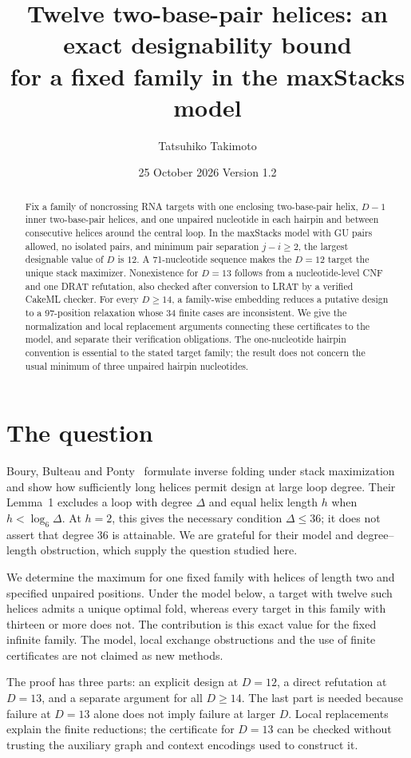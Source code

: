 \documentclass[11pt,a4paper]{article}
\title{Twelve two-base-pair helices: an exact designability bound\protect\\
for a fixed family in the maxStacks model}
\author{Tatsuhiko Takimoto}
\date{25 October 2026 \quad Version 1.2}
\theoremstyle{definition}
\begin{document}
\maketitle
\begin{abstract}
Fix a family of noncrossing RNA targets with one enclosing two-base-pair
helix, $D-1$ inner two-base-pair helices, and one unpaired nucleotide in
each hairpin and between consecutive helices around the central loop.
In the maxStacks model with GU pairs allowed, no isolated pairs, and
minimum pair separation $j-i\geq2$, the largest designable value of $D$
is $12$. A 71-nucleotide sequence makes the $D=12$ target the unique
stack maximizer. Nonexistence for $D=13$ follows from a nucleotide-level
CNF and one DRAT refutation, also checked after conversion to LRAT
by a verified CakeML checker. For every $D\geq14$, a family-wise embedding
reduces a putative design to a 97-position relaxation whose 34 finite
cases are inconsistent. We give the normalization and local replacement
arguments connecting these certificates to the model, and separate
their verification obligations. The one-nucleotide hairpin convention
is essential to the stated target family; the result does not concern
the usual minimum of three unpaired hairpin nucleotides.
\end{abstract}

\section{The question}
Boury, Bulteau and Ponty~\cite{BBP} formulate inverse folding under stack
maximization and show how sufficiently long helices permit design at
large loop degree. Their Lemma~1 excludes a loop with degree $\Delta$
and equal helix length $h$ when $h<\log_6\Delta$. At $h=2$, this gives
the necessary condition $\Delta\leq36$; it does not assert that degree
$36$ is attainable. We are grateful for their model and degree--length
obstruction, which supply the question studied here.

We determine the maximum for one fixed family with helices of length
two and specified unpaired positions. Under the model below, a target
with twelve such helices admits a unique optimal fold, whereas every
target in this family with thirteen or more does not. The contribution
is this exact value for the fixed infinite family. The model, local
exchange obstructions and the use of finite certificates are not
claimed as new methods.

The proof has three parts: an explicit design at $D=12$, a direct
refutation at $D=13$, and a separate argument for all $D\geq14$.
The last part is needed because failure at $D=13$ alone does not imply
failure at larger $D$. Local replacements explain the finite reductions;
the certificate for $D=13$ can be checked without trusting the auxiliary
graph and context encodings used to construct it.
\end{document}

